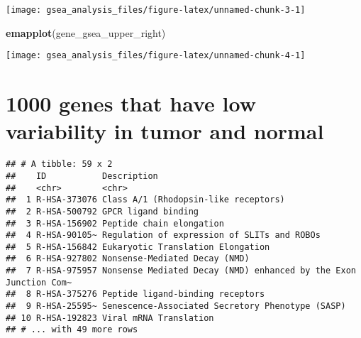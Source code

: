 \documentclass[
]{article}
\newenvironment{Shaded}{\begin{snugshade}}{\end{snugshade}}
\newcommand{\KeywordTok}[1]{\textcolor[rgb]{0.13,0.29,0.53}{\textbf{#1}}}
\newcommand{\NormalTok}[1]{#1}
\newcommand{\OperatorTok}[1]{\textcolor[rgb]{0.81,0.36,0.00}{\textbf{#1}}}
\newcommand{\StringTok}[1]{\textcolor[rgb]{0.31,0.60,0.02}{#1}}
\begin{document}
\texttt{[image: gsea\_analysis\_files/figure-latex/unnamed-chunk-3-1]}

\begin{Shaded}
\begin{Highlighting}[]
\KeywordTok{emapplot}\NormalTok{(gene_gsea_upper_right)}
\end{Highlighting}
\end{Shaded}

\texttt{[image: gsea\_analysis\_files/figure-latex/unnamed-chunk-4-1]}

\hypertarget{genes-that-have-low-variability-in-tumor-and-normal}{%
\section{1000 genes that have low variability in tumor and
normal}\label{genes-that-have-low-variability-in-tumor-and-normal}}

\begin{Shaded}
\end{Shaded}

\begin{verbatim}
## # A tibble: 59 x 2
##    ID           Description                                                     
##    <chr>        <chr>                                                           
##  1 R-HSA-373076 Class A/1 (Rhodopsin-like receptors)                            
##  2 R-HSA-500792 GPCR ligand binding                                             
##  3 R-HSA-156902 Peptide chain elongation                                        
##  4 R-HSA-90105~ Regulation of expression of SLITs and ROBOs                     
##  5 R-HSA-156842 Eukaryotic Translation Elongation                               
##  6 R-HSA-927802 Nonsense-Mediated Decay (NMD)                                   
##  7 R-HSA-975957 Nonsense Mediated Decay (NMD) enhanced by the Exon Junction Com~
##  8 R-HSA-375276 Peptide ligand-binding receptors                                
##  9 R-HSA-25595~ Senescence-Associated Secretory Phenotype (SASP)                
## 10 R-HSA-192823 Viral mRNA Translation                                          
## # ... with 49 more rows
\end{verbatim}
\end{document}
